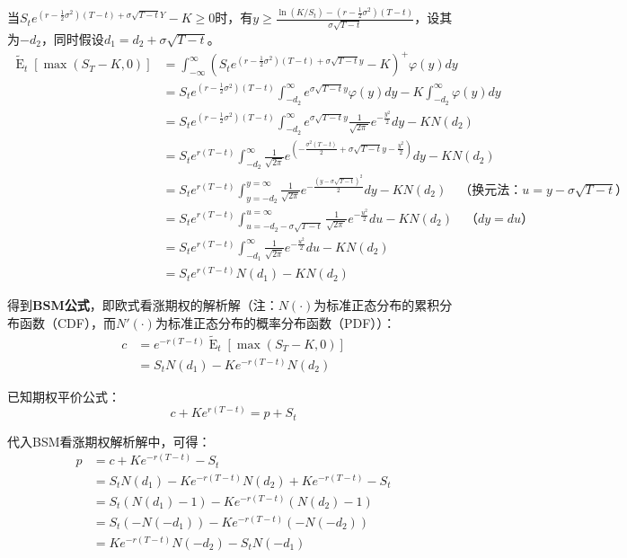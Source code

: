 \documentclass[11pt]{article}
\newcommand{\E}{\operatorname{E}}
\begin{document}
当$S_t e^{(r-\frac{1}{2}\sigma^2)(T-t) + \sigma\sqrt{T-t}Y} - K \geq 0$时，有$y \geq \frac{ \ln (K/S_t) - (r-\frac{1}{2}\sigma^2)(T-t)}{\sigma\sqrt{T-t}}$，设其为$-d_2$，同时假设$d_1 = d_2 + \sigma \sqrt{T-t}$。
\begin{align*}
    \tilde{\E}_t \left[ \max(S_T-K,0) \right] & = \int_{-\infty}^{\infty} \left( S_t e^{(r-\frac{1}{2}\sigma^2)(T-t) + \sigma\sqrt{T-t}y} - K \right)^+ \varphi(y) dy \\
    & = S_t e^{(r-\frac{1}{2}\sigma^2)(T-t)} \int_{-d_2}^{\infty} e^{\sigma\sqrt{T-t} y} \varphi(y)dy - K\int_{-d_2}^{\infty} \varphi(y)dy \\
    & = S_t e^{(r-\frac{1}{2} \sigma^2) (T-t)} \int_{-d_2}^{\infty}{e^{\sigma\sqrt{T-t}y} \frac{1}{\sqrt{2\pi\ }}e^{-\frac{y^2}{2}}dy} - KN\left(d_2\right) \\
    & = S_t e^{r(T-t)} \int_{-d_2}^{\infty} \frac{1}{\sqrt{2\pi}} e^{\left( -\frac{\sigma^2 (T-t)}{2} + \sigma\sqrt{T-t}y - \frac{y^2}{2} \right)} dy - KN(d_2) \\
    & = S_t e^{r(T-t)} \int_{y = -d_2}^{y = \infty} \frac{1}{\sqrt{2\pi}}e^{-\frac{\left(y-\sigma\sqrt{T-t}\right)^2}{2}}dy - KN(d_2) \quad \text{（换元法：$u =y -\sigma\sqrt{T-t}$）} \\
    & =S_t e^{r(T-t)} \int_{u = -d_2-\sigma\sqrt{T-t}}^{u = \infty} \frac{1}{\sqrt{2\pi\ }}e^{-\frac{u^2}{2}}du - KN(d_2) \quad \text{（$dy = du$）} \\
    & = S_t e^{r(T-t)} \int_{-d_1}^{\infty} \frac{1}{\sqrt{2\pi}}e^{-\frac{u^2}{2}} du - KN(d_2) \\
    & = S_t e^{r(T-t)}N(d_1) - KN(d_2)
\end{align*}

得到\textbf{BSM公式}，即欧式看涨期权的解析解（注：$N(\cdot)$为标准正态分布的累积分布函数（CDF），而$N'(\cdot)$为标准正态分布的概率分布函数（PDF））：
\begin{align*}
    c & = e^{-r(T-t)} \tilde{\E}_t \left[ \max(S_T-K,0) \right] \\
    & = S_t N(d_1) - Ke^{-r(T-t)} N(d_2)
\end{align*}


已知期权平价公式：
\begin{equation*}
    c + K e^{r(T-t)} = p + S_t
\end{equation*}

代入BSM看涨期权解析解中，可得：
\begin{align*}
    p & = c + K e^{-r(T-t)} - S_t \\
    & = S_t N(d_1) - Ke^{-r(T-t)} N(d_2) +  Ke^{-r(T-t)} - S_t \\
    & = S_t (N(d_1) - 1) - K e^{-r(T-t)}(N(d_2)-1) \\
    & = S_t (-N(-d_1)) - K e^{-r(T-t)}(-N(-d_2)) \\
    & = K e^{-r(T-t)}N(-d_2) - S_t N(-d_1) \\
\end{align*}
\end{document}

